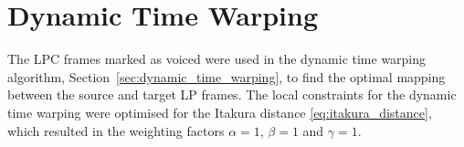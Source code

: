 
\section{Dynamic Time Warping} %
\label{imp:dynamic_time_warping}
The LPC frames marked as voiced were used in the dynamic time warping algorithm, Section~\ref{sec:dynamic_time_warping}, to find the optimal mapping between the source and target LP frames. The local constraints for the dynamic time warping were optimised for the Itakura distance \eqref{eq:itakura_distance}, which resulted in the weighting factors $\alpha=1$, $\beta=1$ and $\gamma=1$.


